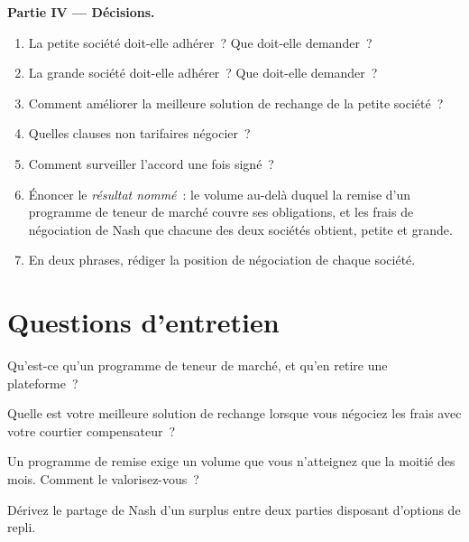 \begin{problem}
\medskip\noindent\textbf{Partie IV --- Décisions.}
\begin{enumerate}[resume]
\item La petite société doit-elle adhérer~? Que doit-elle demander~?
\item La grande société doit-elle adhérer~? Que doit-elle demander~?
\item Comment améliorer la meilleure solution de rechange de la petite société~?
\item Quelles clauses non tarifaires négocier~?
\item Comment surveiller l'accord une fois signé~?
\item Énoncer le \emph{résultat nommé}~: le volume au-delà duquel la remise d'un programme de teneur de marché couvre ses obligations, et les frais de négociation
de Nash que chacune des deux sociétés obtient, petite et grande.
\item En deux phrases, rédiger la position de négociation de chaque société.
\end{enumerate}
\end{problem}

\section{Questions d'entretien}

\begin{interviewq}\label{iq:fm:commercial-relationships-with-venues-brokers-and-vendors:1}
Qu'est-ce qu'un programme de teneur de marché, et qu'en retire une plateforme~?
\end{interviewq}

\begin{interviewq}\label{iq:fm:commercial-relationships-with-venues-brokers-and-vendors:2}
Quelle est votre meilleure solution de rechange lorsque vous négociez les frais avec votre courtier compensateur~?
\end{interviewq}

\begin{interviewq}\label{iq:fm:commercial-relationships-with-venues-brokers-and-vendors:3}
Un programme de remise exige un volume que vous n'atteignez que la moitié des mois. Comment le valorisez-vous~?
\end{interviewq}

\begin{interviewq}\label{iq:fm:commercial-relationships-with-venues-brokers-and-vendors:4}
Dérivez le partage de Nash d'un surplus entre deux parties disposant d'options de repli.
\end{interviewq}


